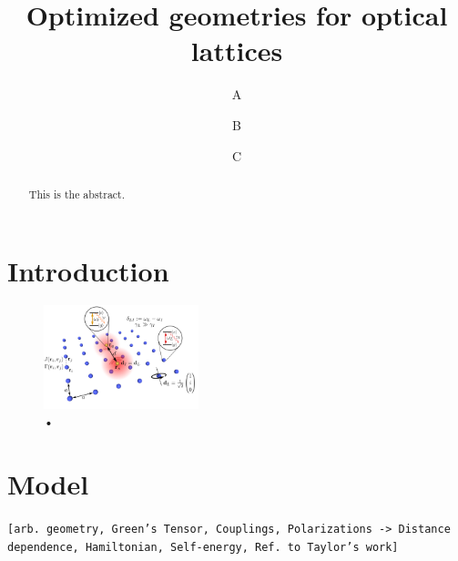 \documentclass[aps,pra,superscriptaddress,twocolumn]{revtex4-1}
\newcommand{\eg}{e.\,g.,\ }
\newcommand{\fref}[1]{\text{Fig.}~\ref{#1}}
\newcommand{\eeref}[1]{\text{Eqs.}~\eqref{#1}}
\newcommand{\commentSB}[1]{\texttt{\color{blue}[#1]}}
\newcommand{\commentSO}[1]{\texttt{\color{orange}[#1]}}
\begin{document}
\title{Optimized geometries for optical lattices}
\author{A}
\author{B}
\author{C}

\begin{abstract}

This is the abstract. 

\end{abstract}

\maketitle

\section{Introduction}



\begin{figure}
\centering
\includegraphics[width=0.4\textwidth]{figures/setup_2.png} 
\caption{•}
\label{fig:setup}
\end{figure}


\section{Model}
\commentSO{arb. geometry, Green's Tensor, Couplings, Polarizations -> Distance dependence, Hamiltonian, Self-energy, Ref. to Taylor's work}
\end{document}
